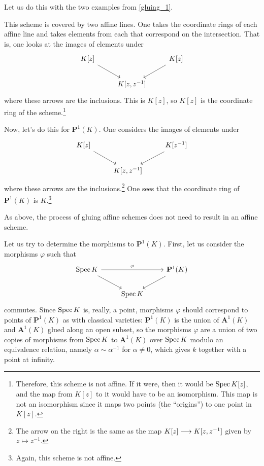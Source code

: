 \documentclass [11 pt, oneside] {article}
\begin{document}
Let us do this with the two examples from \cref{gluing_1}.

\begin{example}\label{}\text{}
This scheme is covered by two affine lines. One takes the coordinate rings of each affine line and takes elements from each that correspond on the intersection. That is, one looks at the images of elements under
\[
\begin{tikzcd}
	K[z]\ar[dr] && K[z] \ar[dl]\\
	&K[z,z^{-1}]
\end{tikzcd}
\]
where these arrows are the inclusions. This is $K[z]$, so $K[z]$ is the coordinate ring of the scheme.\footnote{Therefore, this scheme is not affine. If it were, then it would be $\operatorname{Spec} K[z]$, and the map from $K[z]$ to it would have to be an isomorphism. This map is not an isomorphism since it maps two points (the ``origins'') to one point in $K[z]$.}
\end{example}

\begin{example}[ ]\label{}\text{}
Now, let's do this for $\mathbf{P}^1(K)$. One considers the images of elements under
\[
\begin{tikzcd}
        K[z]\ar[dr] && K[z^{-1}] \ar[dl]\\
        &K[z,z^{-1}]
\end{tikzcd}
\]
where these arrows are the inclusions.\footnote{The arrow on the right is the same as the map $K[z]\longrightarrow K[z,z^{-1}]$ given by $z\longmapsto z^{-1}$.} One sees that the coordinate ring of $\mathbf{P}^1(K)$ is $K$.\footnote{Again, this scheme is not affine.}
\end{example}

\begin{remark}
	As above, the process of gluing affine schemes does not need to result in an affine scheme.
\end{remark}

Let us try to determine the morphisms to $\mathbf{P}^1(K)$. First, let us consider the morphisms $\varphi$ such that 
\[
\begin{tikzcd}
	\Spec K \ar[dr]\ar[rr,"\varphi"] && \mathbf{P}^1(K)\ar[dl]\\
					 &\Spec K
\end{tikzcd}
\]
commutes. Since $\operatorname{Spec} K$ is, really, a point, morphisms $\varphi$ should correspond to points of $\mathbf{P}^1(K)$ as with classical varieties: $\mathbf{P}^1(K)$ is the union of $\mathbf{A}^1(K)$ and $\mathbf{A}^1(K)$ glued along an open subset, so the morphisms $\varphi$ are a union of two copies of morphisms from $\operatorname{Spec} K$ to $\mathbf{A}^1(K)$ over $\operatorname{Spec} K$ modulo an equivalence relation, namely $\alpha\sim \alpha ^{-1}$ for $\alpha\ne 0$, which gives $k$ together with a point at infinity.
\end{document}

